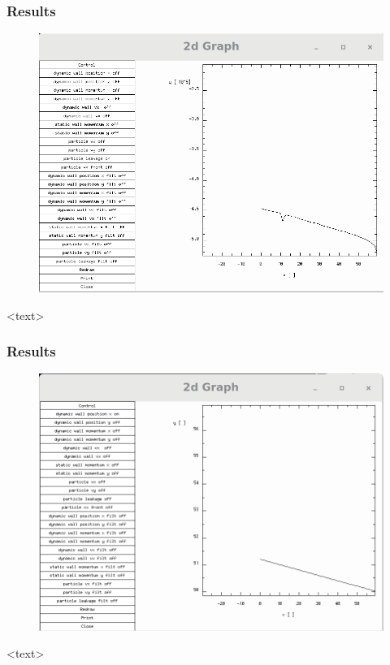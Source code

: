 \documentclass{beamer}
\begin{document}
\begin{frame}
\frametitle{Results}
\begin{figure}
\includegraphics[scale=0.2]{A11p3}
\caption{}
\end{figure}
<text>
\end{frame}

\begin{frame}
\frametitle{Results}
\begin{figure}
\includegraphics[scale=0.2]{A11p4}
\caption{}
\end{figure}
<text>
\end{frame}
\end{document}

